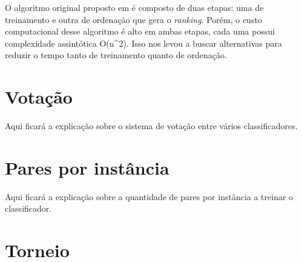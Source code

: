 O algoritmo original proposto em \cite{langford08} é composto de duas etapas: uma de treinamento e outra de ordenação que gera o \emph{ranking}. Porém, o custo computacional desse algoritmo é alto em ambas etapas, cada uma possui complexidade assintótica O(n^2). Isso nos levou a buscar alternativas para reduzir o tempo tanto de treinamento quanto de ordenação.

\section{Votação}
Aqui ficará a explicação sobre o sistema de votação entre vários classificadores.

\section{Pares por instância}
Aqui ficará a explicação sobre a quantidade de pares por instância a treinar o classificador.

\section{Torneio}
